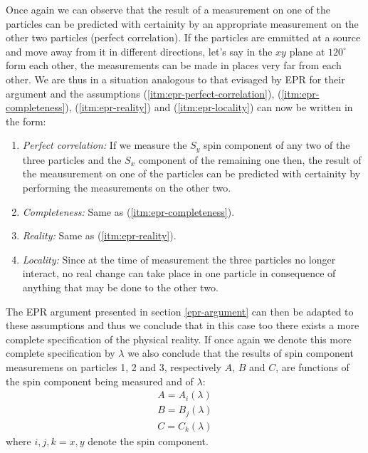 Once again we can observe that the result of a measurement on one of the particles can be predicted with certainity by an appropriate measurement on the other two particles (perfect correlation). If the particles are emmitted at a source and move away from it in different directions, let's say in the $xy$ plane at $120^{\circ}$ form each other, the measurements can be made in places very far from each other. We are thus in a situation analogous to that evisaged by EPR for their argument and the assumptions (\ref{itm:epr-perfect-correlation}), (\ref{itm:epr-completeness}), (\ref{itm:epr-reality}) and (\ref{itm:epr-locality}) can now be written in the form:%

\begin{enumerate}[label=(\alph*$'$)]
\item \label{itm:epr-perfect-correlation'} \textit{Perfect correlation:} If we measure the $S_y$ spin component of any two of the three particles and the $S_x$ component of the remaining one then, the result of the meausurement on one of the particles can be predicted with certainity by performing the measurements on the other two.
\item \label{itm:epr-completeness'} \textit{Completeness:} Same as (\ref{itm:epr-completeness}).
\item \label{itm:epr-reality'} \textit{Reality:} Same as (\ref{itm:epr-reality}).
\item \label{itm:epr-locality'} \textit{Locality:} Since at the time of measurement the three particles no longer interact, no real change can take place in one particle in consequence of anything that may be done to the other two.
\end{enumerate}
The EPR argument presented in section \ref{epr-argument} can then be adapted to these assumptions and thus we conclude that in this case too there exists a more complete specification of the physical reality. If once again we denote this more complete specification by $\lambda$ we also conclude that the results of spin component measuremens on particles 1, 2 and 3, respectively $A$, $B$ and $C$, are functions of the spin component being measured and of $\lambda$:%
\begin{equation}
  \begin{split}
      A = A_i(\lambda)\\
      B = B_j(\lambda)\\
      C = C_k(\lambda)
  \end{split}
\end{equation}
where $i, j, k = x, y$ denote the spin component.%


